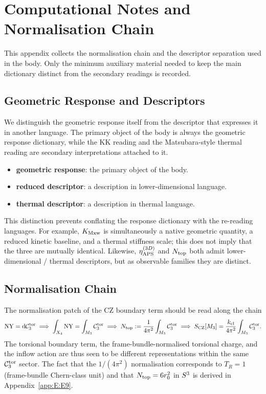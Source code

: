 \section{Computational Notes and Normalisation Chain}
\label{app:D}

This appendix collects the normalisation chain and the descriptor separation
used in the body.  Only the minimum auxiliary material needed to keep the
main dictionary distinct from the secondary readings is recorded.

\subsection{Geometric Response and Descriptors}
\label{app:D:descriptor}

We distinguish the geometric response itself from the descriptor that
expresses it in another language.  The primary object of the body is always
the geometric response dictionary, while the KK reading and the
Matsubara-style thermal reading are secondary interpretations attached to
it.

\begin{itemize}
  \item \textbf{geometric response}: the primary object of the body.
  \item \textbf{reduced descriptor}: a description in lower-dimensional
        language.
  \item \textbf{thermal descriptor}: a description in thermal language.
\end{itemize}

This distinction prevents conflating the response dictionary with the
re-reading languages.  For example, $K_{\mathrm{Mxw}}$ is simultaneously a native
geometric quantity, a reduced kinetic baseline, and a thermal stiffness
scale; this does not imply that the three are mutually identical.
Likewise, $\eta_{\mathrm{APS}}^{(3D)}$ and $N_{\mathrm{top}}$ both admit lower-dimensional / thermal
descriptors, but as observable families they are distinct.

\subsection{Normalisation Chain}
\label{app:D:chain}

The normalisation patch of the CZ boundary term should be read along the
chain
\begin{equation}
  \mathrm{NY} = \mathrm{d} \mathcal{C}_3^{\mathrm{tor}}
  \;\Longrightarrow\;
  \int_{X_4}\mathrm{NY} = \int_{M_3}\mathcal{C}_3^{\mathrm{tor}}
  \;\Longrightarrow\;
  N_{\mathrm{top}} := \frac{1}{4\pi^2}\int_{M_3}\mathcal{C}_3^{\mathrm{tor}}
  \;\Longrightarrow\;
  S_{\mathrm{CZ}}[M_3] = \frac{k_{\mathrm{cl}}}{4\pi^2}\int_{M_3}\mathcal{C}_3^{\mathrm{tor}}.
\end{equation}
The torsional boundary term, the frame-bundle-normalised torsional charge,
and the inflow action are thus seen to be different representations within
the same $\mathcal{C}_3^{\mathrm{tor}}$ sector.  The fact that the $1/(4\pi^2)$ normalisation
corresponds to $T_R = 1$ (frame-bundle Chern-class unit) and that
$N_{\mathrm{top}} = 6 r_0^2$ in $S^3$ is derived in Appendix~\ref{app:E:E9}.

